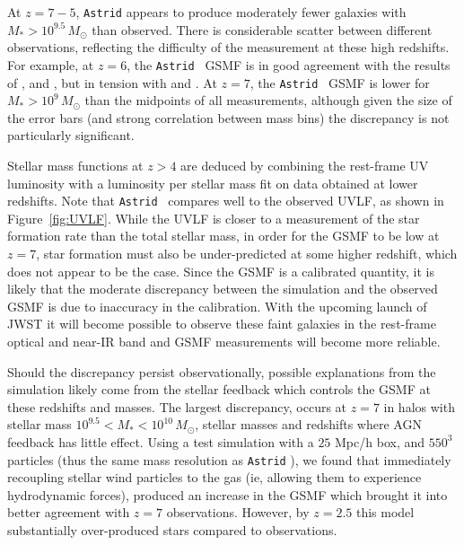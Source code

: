 \documentclass[fleqn,usenatbib]{mnras}
\def\astrid{\texttt{Astrid} }
\def\msun{\, M_{\odot}}
\begin{document}
At $z = 7-5$, \astrid appears to produce moderately fewer galaxies with $M_* > 10^{9.5} \msun$ than observed. There is considerable scatter between different observations, reflecting the difficulty of the measurement at these high redshifts. For example, at $z=6$, the \astrid~GSMF is in good agreement with the results of \cite{Stefanon2017}, \cite{Gonzalez2011} and \cite{Song2016}, but in tension with \cite{Grazian2015} and \cite{Duncan2014}. At $z=7$, the \astrid~GSMF is lower for $M_* > 10^9 \msun$ than the midpoints of all measurements, although given the size of the error bars (and strong correlation between mass bins) the discrepancy is not particularly significant.

Stellar mass functions at $z > 4$ are deduced by combining the rest-frame UV luminosity with a luminosity per stellar mass fit on data obtained at lower redshifts. Note that \astrid~compares well to the observed UVLF, as shown in Figure~\ref{fig:UVLF}. While the UVLF is closer to a measurement of the star formation rate than the total stellar mass, in order for the GSMF to be low at $z=7$, star formation must also be under-predicted at some higher redshift, which does not appear to be the case. Since the GSMF is a calibrated quantity, it is likely that the moderate discrepancy between the simulation and the observed GSMF is due to inaccuracy in the calibration. With the upcoming launch of JWST it will become possible to observe these faint galaxies in the rest-frame optical and near-IR band and GSMF measurements will become more reliable.

Should the discrepancy persist observationally, possible explanations from the simulation likely come from the stellar feedback which controls the GSMF at these redshifts and masses. The largest discrepancy, occurs at $z=7$ in halos with stellar mass $10^{9.5} < M_* < 10^{10} \msun$, stellar masses and redshifts where AGN feedback has little effect. Using a test simulation with a $25$ Mpc/h box, and $550^3$ particles (thus the same mass resolution as \astrid), we found that immediately recoupling stellar wind particles to the gas (ie, allowing them to experience hydrodynamic forces), produced an increase in the GSMF which brought it into better agreement with $z=7$ observations. However, by $z=2.5$ this model  substantially over-produced stars compared to observations.

\end{document}
